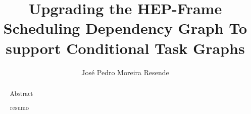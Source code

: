 \documentclass[a4paper, twoside]{report}
\title{Upgrading the HEP-Frame Scheduling Dependency Graph To support Conditional Task Graphs }
\author{José Pedro Moreira Resende}
\begin{document}


\begin{abstract}
  Abstract
\end{abstract}

\renewcommand{\abstractname}{Resumo}
\begin{abstract}
  resumo
\end{abstract}


\clearpage %

\tableofcontents
\listoffigures
\listoftables




\end{document}
